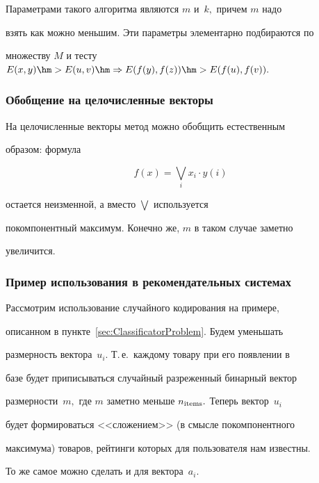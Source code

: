 Параметрами такого алгоритма являются $m$ и~$k,$ причем $m$ надо


взять как можно меньшим. Эти параметры элементарно подбираются по


множеству $M$ и тесту $E(x,y)\hm>E(u,v) \hm\Rightarrow


E(f(y),f(z))\hm>E(f(u),f(v)).$





\subsubsection{Обобщение на целочисленные векторы}





На целочисленные векторы метод можно обобщить естественным


образом: формула


$$


f(x)=\bigvee\limits_{i}x_i \cdot y(i)


$$


остается неизменной, а вместо $\bigvee$ используется


покомпонентный максимум. Конечно же, $m$ в таком случае заметно


увеличится.





\subsubsection{Пример использования в рекомендательных системах}





Рассмотрим использование случайного кодирования на примере,


описанном в пункте~\ref{sec:ClassificatorProblem}. Будем уменьшать


размерность вектора~$u_i.$ Т.\,е.\ каждому товару при его появлении в


базе будет приписываться случайный разреженный бинарный вектор


размерности~$m,$ где $m$ заметно меньше $n_{\mathrm{items}}.$ Теперь вектор~$u_i$


будет формироваться <<сложением>> (в смыс\-ле покомпонентного


максимума) товаров, рейтинги которых для пользователя нам известны.


То же самое можно сделать и для вектора~$a_i.$





